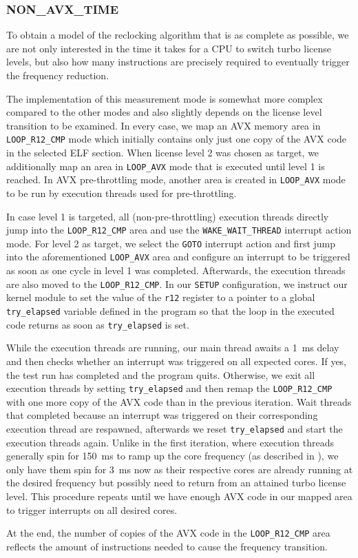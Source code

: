 \subsubsection{NON\_AVX\_TIME}
\label{sec:analysis:design:measurementmodes:nonavxtime}

To obtain a model of the reclocking algorithm that is as complete as possible, we are not only interested in the time it takes for a \gls{CPU} to switch turbo license levels, but also how many instructions are precisely required to eventually trigger the frequency reduction.

The implementation of this measurement mode is somewhat more complex compared to the other modes and also slightly depends on the license level transition to be examined. In every case, we map an \gls{AVX} memory area in \texttt{LOOP\_R12\_CMP} mode which initially contains only just one copy of the \gls{AVX} code in the selected \gls{ELF} section. When license level 2 was chosen as target, we additionally map an area in \texttt{LOOP\_AVX} mode that is executed until level 1 is reached. In \gls{AVX} pre-throttling mode, another area is created in \texttt{LOOP\_AVX} mode to be run by execution threads used for pre-throttling.

In case level 1 is targeted, all (non-pre-throttling) execution threads directly jump into the \texttt{LOOP\_R12\_CMP} area and use the \texttt{WAKE\_WAIT\_THREAD} interrupt action mode. For level 2 as target, we select the \texttt{GOTO} interrupt action and first jump into the aforementioned \texttt{LOOP\_AVX} area and configure an interrupt to be triggered as soon as one cycle in level 1 was completed. Afterwards, the execution threads are also moved to the \texttt{LOOP\_R12\_CMP}. In our \texttt{SETUP} configuration, we instruct our kernel module to set the value of the \texttt{r12} register to a pointer to a global \texttt{try\_elapsed} variable defined in the program so that the loop in the executed code returns as soon as \texttt{try\_elapsed} is set.

While the execution threads are running, our main thread awaits a \SI{1}{\milli\second} delay and then checks whether an interrupt was triggered on all expected cores. If yes, the test run has completed and the program quits. Otherwise, we exit all execution threads by setting \texttt{try\_elapsed} and then remap the \texttt{LOOP\_R12\_CMP} with one more copy of the \gls{AVX} code than in the previous iteration. Wait threads that completed because an interrupt was triggered on their corresponding execution thread are respawned, afterwards we reset \texttt{try\_elapsed} and start the execution threads again. Unlike in the first iteration, where execution threads generally spin for \SI{150}{\milli\second} to ramp up the core frequency (as described in ), we only have them spin for \SI{3}{\milli\second} now as their respective cores are already running at the desired frequency but possibly need to return from an attained turbo license level. This procedure repeats until we have enough \gls{AVX} code in our mapped area to trigger interrupts on all desired cores.

At the end, the number of copies of the \gls{AVX} code in the \texttt{LOOP\_R12\_CMP} area reflects the amount of instructions needed to cause the frequency transition.